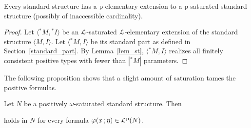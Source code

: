 \documentclass[10pt,oneside]{amsproc}
\begin{document}
\begin{theorem}
  Every standard structure has a p-elementary extension to a p-saturated standard structure (possibly of inaccessible cardinality).
\end{theorem}

\begin{proof}
  Let $\langle {}^*\!\!M,{}^*\!\!I\rangle$ be an ${\EuScript L}$-saturated ${\EuScript L}$-elementary extension of the standard structure $\langle M,I\rangle$.
  Let $\langle {}^*\!\!M,I\rangle$ be its standard part as defined in Section~\ref{standard_part}.
  By Lemma~\ref{lem_st}, $\langle {}^*\!\!M,I\rangle$ realizes all finitely consistent positive types with fewer than $|{}^*\!\!M|$ parameters.
\end{proof}





The following proposition shows that a slight amount of saturation tames the positive formulas.

\begin{proposition}\label{prop_approx}
  Let $N$ be a positively $\omega$-saturated standard structure.
  Then 
  
  
  holds in $N$ for every formula $\varphi(x\,;\eta)\in{\EuScript L}^{\rm p}(N)$.
\end{proposition}
\end{document}
